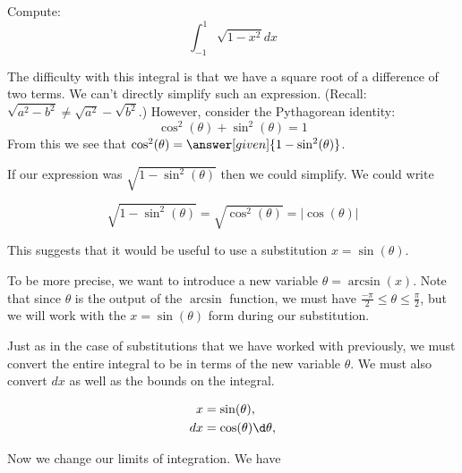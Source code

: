 \documentclass{ximera}
\begin{document}
\begin{example}
  Compute:
  \[
  \int_{-1}^1 \sqrt{1-x^2} dx
  \]
  \begin{explanation}

    The difficulty with this integral is that we have a square root of a difference of two terms.
    We can't directly simplify such an expression. (Recall:  $\sqrt{a^2-b^2} \neq \sqrt{a^2} - \sqrt{b^2}$.)  However, consider the Pythagorean identity:
    \[
    \cos^2(\theta) + \sin^2(\theta) = 1
    \]
    From this we see that $\cos^2(\theta)=
    \answer[given]{1-\sin^2(\theta)}$.


   If our expression was $\sqrt{1-\sin^{2}(\theta)}$ then we could simplify.
   We could write 

\[
\sqrt{1-\sin^{2}(\theta)}=\sqrt{\cos^{2}(\theta)}=|\cos(\theta)|
\]
%

This suggests that it would be useful to use a substitution $x=\sin(\theta)$. 

\begin{remark}
To be more precise, we want to introduce a new variable $\theta=\arcsin(x)$. 
Note that since $\theta$ is the output of the $\arcsin$ function, we must have $\frac{-\pi}{2} \leq \theta \leq \frac{\pi}{2} $, but we will work with the $x=\sin(\theta)$ form during our substitution.
\end{remark}

Just as in the case of substitutions that we have worked with previously, we must convert the entire integral to be in terms of the new variable $\theta$. 
We must also convert  $dx$ as well as the bounds on the integral.

    \begin{align*}
      x &=\sin(\theta),\\
      dx &= \cos(\theta) \d\theta,
    \end{align*}

   Now we change our limits of
    integration. We have 


\end{explanation}
\end{example}
\end{document}
